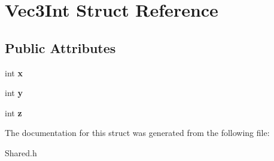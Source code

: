 \hypertarget{structVec3Int}{
\section{Vec3Int Struct Reference}
\label{structVec3Int}
}
\subsection*{Public Attributes}
\begin{DoxyCompactItemize}
\item 
\hypertarget{structVec3Int_a44935d1305643977b1024f39b885484f}{
int {\bfseries x}}
\label{structVec3Int_a44935d1305643977b1024f39b885484f}

\item 
\hypertarget{structVec3Int_a7a224fc2baac6cafdfec2a91ce07d9c6}{
int {\bfseries y}}
\label{structVec3Int_a7a224fc2baac6cafdfec2a91ce07d9c6}

\item 
\hypertarget{structVec3Int_aab272c491f87e5340132f049b1b74c6b}{
int {\bfseries z}}
\label{structVec3Int_aab272c491f87e5340132f049b1b74c6b}

\end{DoxyCompactItemize}


The documentation for this struct was generated from the following file:\begin{DoxyCompactItemize}
\item 
Shared.h\end{DoxyCompactItemize}
